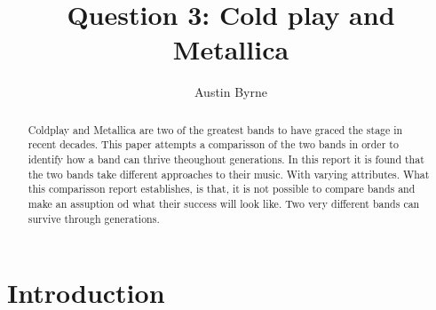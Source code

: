 \documentclass[11pt,preprint, authoryear]{elsarticle}
\numberwithin{equation}{section}
\numberwithin{figure}{section}
\numberwithin{table}{section}
\begin{document}
\begin{frontmatter}  %

\title{Question 3: Cold play and Metallica}





\author[Add1]{Austin Byrne}





\address[Add1]{Music fenatic, Stellenbosch, South Africa}


\begin{abstract}
\small{
Coldplay and Metallica are two of the greatest bands to have graced the
stage in recent decades. This paper attempts a comparisson of the two
bands in order to identify how a band can thrive theoughout generations.
In this report it is found that the two bands take different approaches
to their music. With varying attributes. What this comparisson report
establishes, is that, it is not possible to compare bands and make an
assuption od what their success will look like. Two very different bands
can survive through generations.
}
\end{abstract}

\vspace{1cm}





\vspace{0.5cm}

\end{frontmatter}

\setcounter{footnote}{0}



\pagestyle{fancy}
\chead{}
\rhead{}
\lfoot{}
\lhead{}
\cfoot{}


\headsep 35pt %




\hypertarget{introduction}{%
\section{\texorpdfstring{Introduction
\label{Introduction}}{Introduction }}\label{introduction}}
\end{document}
